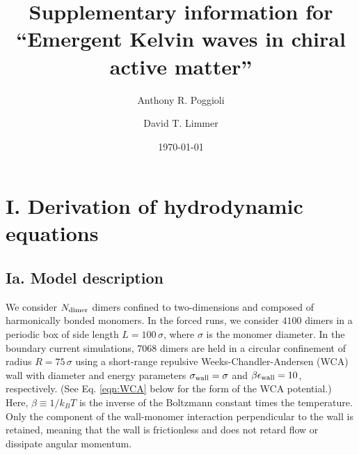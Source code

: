 \documentclass[%
 reprint,
superscriptaddress,
longbibliography,
 amsmath,amssymb,
 prl,
 citeautoscript,
]{revtex4-1}
\begin{document}
\title{Supplementary information for ``Emergent Kelvin waves in chiral active matter''}

\author{Anthony R. Poggioli}

\author{David T. Limmer}



\date{\today}

\maketitle

\tableofcontents

\section{I. Derivation of hydrodynamic equations}
\label{sec:hydro_derivation}

\subsection{Ia. Model description}

We consider $N_{\rm dimer}$ dimers confined to two-dimensions and composed of harmonically bonded monomers. In the forced runs, we consider $4100$ dimers in a periodic box of side length $L = 100 \, \sigma$, where $\sigma$ is the monomer diameter. In the boundary current simulations, $7068$ dimers are held in a circular confinement of radius $R = 75 \, \sigma$ using a short-range repulsive Weeks-Chandler-Andersen (WCA) wall \cite{WCA} with diameter and energy parameters $\sigma_{\rm wall} = \sigma$ and $\beta \epsilon_{\rm wall} = 10$, respectively. (See Eq. \ref{eqn:WCA} below for the form of the WCA potential.) Here, $\beta \equiv 1 / k_B T$ is the inverse of the Boltzmann constant times the temperature. Only the component of the wall-monomer interaction perpendicular to the wall is retained, meaning that the wall is frictionless and does not retard flow or dissipate angular momentum.
\end{document}
